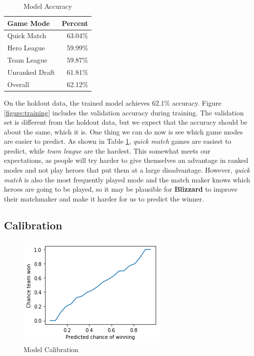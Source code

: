 \documentclass[twoside,twocolumn]{article}
\begin{document}
\begin{table}[h]
\caption{Model Accuracy}
\label{table:acc}
\centering
\begin{tabular}{lr}
\toprule
Game Mode & Percent \\
\midrule
Quick Match & 63.04\% \\
Hero League & 59.99\% \\
Team League & 59.87\% \\
Unranked Draft & 61.81\% \\
\midrule
Overall & 62.12\% \\
\bottomrule
\end{tabular}
\end{table}

On the holdout data, the trained model achieves 62.1\% accuracy.  Figure \ref{figure:training} includes the validation accuracy during training.  The validation set is different from the holdout data, but we expect that the accuracy should be about the same, which it is.  One thing we can do now is see which game modes are easier to predict.  As shown in Table \ref{table:acc}, \textit{quick match} games are easiest to predict, while \textit{team league} are the hardest.  This somewhat meets our expectations, as people will try harder to give themselves an advantage in ranked modes and not play heroes that put them at a large disadvantage.  However, \textit{quick match} is also the most frequently played mode and the match maker knows which heroes are going to be played, so it may be plausible for \textbf{Blizzard} to improve their matchmaker and make it harder for us to predict the winner.

\subsection{Calibration}

\begin{figure}[h]
\caption{Model Calibration}
\label{figure:calib}
\centering
\includegraphics[width=\linewidth]{calibration}
\end{figure}
\end{document}
